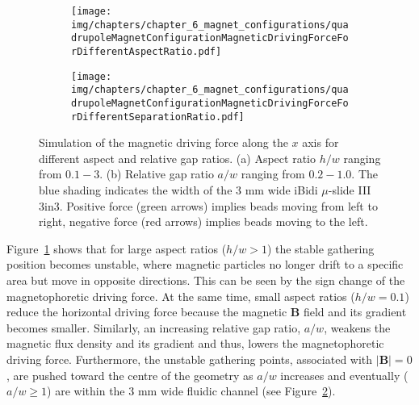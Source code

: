 \begin{figure}[htb!]
\centering
	\begin{subfigure}[b]{0.6\textwidth}
		\texttt{[image: img/chapters/chapter\_6\_magnet\_configurations/quadrupoleMagnetConfigurationMagneticDrivingForceForDifferentAspectRatio.pdf]}
	\caption{}
    \label{fig:quadrupoleMagnetConfigurationMagneticDrivingFroceAspectRatio}
    \end{subfigure}
    \hfill
	\begin{subfigure}[b]{0.6\textwidth}
		\texttt{[image: img/chapters/chapter\_6\_magnet\_configurations/quadrupoleMagnetConfigurationMagneticDrivingForceForDifferentSeparationRatio.pdf]}
	\caption{}
	\label{fig:quadrupoleMagnetConfigurationMagneticDrivingFroceSeparationRatio}
	\end{subfigure}
\caption[Magnetic driving force simulation of the Quadrupole configuration for different aspect and relative gap ratios]{Simulation of the magnetic driving force along the $x$ axis for different aspect and relative gap ratios. (a) Aspect ratio $h/w$ ranging from $0.1-3$. (b) Relative gap ratio $a/w$ ranging from $0.2-1.0$. The blue shading indicates the width of the $3$ mm wide iBidi $\mu$-slide III 3in3. Positive force (green arrows) implies beads moving from left to right, negative force (red arrows) implies beads moving to the left.}
\label{fig:quadrupoleMagnetConfigurationMagneticDrivingForceForDifferentRatio}
\end{figure}

Figure~\ref{fig:quadrupoleMagnetConfigurationMagneticDrivingFroceAspectRatio} shows that for large aspect ratios ($h/w>1$) the stable gathering position becomes unstable, where magnetic particles no longer drift to a specific area but move in opposite directions. This can be seen by the sign change of the magnetophoretic driving force. At the same time, small aspect ratios ($h/w=0.1$) reduce the horizontal driving force because the magnetic $\mathbf{B}$ field and its gradient becomes smaller. Similarly, an increasing relative gap ratio, $a/w$, weakens the magnetic flux density and its gradient and thus, lowers the magnetophoretic driving force. Furthermore, the unstable gathering points, associated with $|\mathbf{B}|=0$, are pushed toward the centre of the geometry as $a/w$ increases and eventually ($a/w \geq 1$) are within the $3$ mm wide fluidic channel (see Figure~\ref{fig:quadrupoleMagnetConfigurationMagneticDrivingFroceSeparationRatio}).


